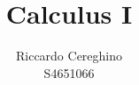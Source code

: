 \documentclass[11]{report}
\begin{document}
\begin{titlepage}
	\title{Calculus I}
	\author{Riccardo Cereghino \\ S4651066}
	\maketitle
\end{titlepage}
\end{document}
